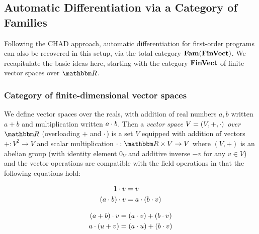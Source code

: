 \subsection{Automatic Differentiation via a Category of Families}

Following the CHAD approach, automatic differentiation for first-order programs can also be recovered in this
setup, via the total category $\mathbf{Fam}(\mathbf{FinVect})$. We recapitulate the basic ideas here, starting with the
category $\mathbf{FinVect}$ of finite vector spaces over $\RR$.

\subsubsection{Category of finite-dimensional vector spaces}
\label{sec:categories-with-biproducts:fdvect}

\begin{definition}
We define vector spaces over the reals, with addition of real numbers $a, b$ written $a + b$ and
multiplication written $a \cdot b$. Then a \emph{vector space $V = (V, +, \cdot)$ over $\RR$} (overloading $+$
and $\cdot$) is a set $V$ equipped with addition of vectors $+: V^2 \to V$ and scalar multiplication $\mult:
\RR \times V \to V$ where $(V,+)$ is an abelian group (with identity element $0_V$ and additive inverse $-v$
for any $v \in V$) and the vector operations are compatible with the field operations in that the following
equations hold:

\vspace{-3mm}
\begin{minipage}[t]{0.45\textwidth}
\begin{center}
\begin{align*}
   1 \cdot v &= v \\
   (a \cdot b) \cdot v &= a \cdot (b \cdot v)
\end{align*}
\end{center}
\end{minipage}%
\begin{minipage}[t]{0.45\textwidth}
\begin{center}
\begin{align*}
   (a + b) \cdot v &= (a \cdot v) + (b \cdot v) \\
   a \cdot (u + v) &= (a \cdot u) + (b \cdot v)
\end{align*}
\end{center}
\end{minipage}
\end{definition}

